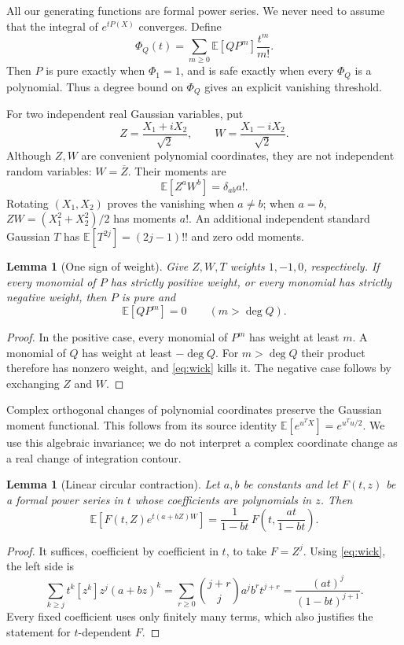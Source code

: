 \documentclass[11pt]{article}
\newtheorem{lemma}[theorem]{Lemma}
\theoremstyle{definition}\newtheorem{definition}[theorem]{Definition}
\theoremstyle{remark}\newtheorem{remark}[theorem]{Remark}
\newcommand{\E}{\mathbb E}
\begin{document}
All our generating functions are formal power series. We never need to
assume that the integral of $e^{tP(X)}$ converges. Define
\begin{equation}\label{eq:phi}
 \Phi_Q(t)=\sum_{m\geq0}\E[QP^m]\frac{t^m}{m!}.
\end{equation}
Then $P$ is pure exactly when $\Phi_1=1$, and is safe exactly when
every $\Phi_Q$ is a polynomial. Thus a degree bound on $\Phi_Q$ gives
an explicit vanishing threshold.

For two independent real Gaussian variables, put
\[
 Z=\frac{X_1+iX_2}{\sqrt2},\qquad
 W=\frac{X_1-iX_2}{\sqrt2}.
\]
Although $Z,W$ are convenient polynomial coordinates, they are not
independent random variables: $W=\overline Z$. Their moments are
\begin{equation}\label{eq:wick}
 \E[Z^aW^b]=\delta_{ab}a!.
\end{equation}
Rotating $(X_1,X_2)$ proves the vanishing when $a\ne b$; when $a=b$,
$ZW=(X_1^2+X_2^2)/2$ has moments $a!$. An additional independent
standard Gaussian $T$ has $\E[T^{2j}]=(2j-1)!!$ and zero odd moments.

\begin{lemma}[One sign of weight]\label{lem:weight}
Give $Z,W,T$ weights $1,-1,0$, respectively. If every monomial of $P$
has strictly positive weight, or every monomial has strictly negative
weight, then $P$ is pure and
\[
 \E[QP^m]=0\qquad(m>\deg Q).
\]
\end{lemma}
\begin{proof}
In the positive case, every monomial of $P^m$ has weight at least $m$.
A monomial of $Q$ has weight at least $-\deg Q$. For $m>\deg Q$ their
product therefore has nonzero weight, and \eqref{eq:wick} kills it.
The negative case follows by exchanging $Z$ and $W$.
\end{proof}

Complex orthogonal changes of polynomial coordinates preserve the
Gaussian moment functional. This follows from its source identity
$\E[e^{u^TX}]=e^{u^Tu/2}$. We use this algebraic invariance; we do not
interpret a complex coordinate change as a real change of integration
contour.

\begin{lemma}[Linear circular contraction]\label{lem:contraction}
Let $a,b$ be constants and let $F(t,z)$ be a formal power series in $t$
whose coefficients are polynomials in $z$. Then
\begin{equation}\label{eq:contraction}
 \E\!\left[F(t,Z)e^{t(a+bZ)W}\right]
   =\frac{1}{1-bt}\,
       F\!\left(t,\frac{at}{1-bt}\right).
\end{equation}
\end{lemma}
\begin{proof}
It suffices, coefficient by coefficient in $t$, to take $F=Z^j$.
Using \eqref{eq:wick}, the left side is
\[
 \sum_{k\geq j}t^k[z^k]z^j(a+bz)^k
 =\sum_{r\geq0}\binom{j+r}{j}a^j b^r t^{j+r}
 =\frac{(at)^j}{(1-bt)^{j+1}}.
\]
Every fixed coefficient uses only finitely many terms, which also
justifies the statement for $t$-dependent $F$.
\end{proof}
\end{document}
